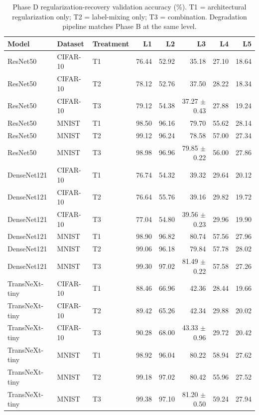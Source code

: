 \begin{table}[htbp]
\centering
\caption{Phase D regularization-recovery validation accuracy (\%). T1 = architectural regularization only; T2 = label-mixing only; T3 = combination. Degradation pipeline matches Phase B at the same level.}
\label{tab:phase_d}
\setlength{\tabcolsep}{4pt}
\renewcommand{\arraystretch}{1.1}
\begin{tabular}{lllrrrrr}
\toprule
Model & Dataset & Treatment & L1 & L2 & L3 & L4 & L5 \\
\midrule
ResNet50 & CIFAR-10 & T1 & 76.44 & 52.92 & 35.18 & 27.10 & 18.64 \\
ResNet50 & CIFAR-10 & T2 & 78.12 & 52.76 & 37.50 & 28.22 & 18.34 \\
ResNet50 & CIFAR-10 & T3 & 79.12 & 54.38 & 37.27 $\pm$ 0.43 & 27.88 & 19.24 \\
ResNet50 & MNIST & T1 & 98.50 & 96.16 & 79.70 & 55.62 & 28.14 \\
ResNet50 & MNIST & T2 & 99.12 & 96.24 & 78.58 & 57.00 & 27.34 \\
ResNet50 & MNIST & T3 & 98.98 & 96.96 & 79.85 $\pm$ 0.22 & 56.00 & 27.86 \\
DenseNet121 & CIFAR-10 & T1 & 76.74 & 54.32 & 39.32 & 29.64 & 20.12 \\
DenseNet121 & CIFAR-10 & T2 & 76.64 & 55.76 & 39.16 & 29.82 & 19.72 \\
DenseNet121 & CIFAR-10 & T3 & 77.04 & 54.80 & 39.56 $\pm$ 0.23 & 29.96 & 19.90 \\
DenseNet121 & MNIST & T1 & 98.90 & 96.82 & 80.74 & 57.56 & 27.96 \\
DenseNet121 & MNIST & T2 & 99.06 & 96.18 & 79.84 & 57.78 & 28.02 \\
DenseNet121 & MNIST & T3 & 99.30 & 97.02 & 81.49 $\pm$ 0.22 & 57.58 & 27.26 \\
TransNeXt-tiny & CIFAR-10 & T1 & 88.46 & 66.96 & 42.36 & 28.44 & 19.66 \\
TransNeXt-tiny & CIFAR-10 & T2 & 89.42 & 65.26 & 42.34 & 29.88 & 20.02 \\
TransNeXt-tiny & CIFAR-10 & T3 & 90.28 & 68.00 & 43.33 $\pm$ 0.96 & 29.72 & 20.42 \\
TransNeXt-tiny & MNIST & T1 & 98.92 & 96.04 & 80.22 & 58.94 & 27.62 \\
TransNeXt-tiny & MNIST & T2 & 99.18 & 97.02 & 80.42 & 55.96 & 27.52 \\
TransNeXt-tiny & MNIST & T3 & 99.38 & 97.10 & 81.20 $\pm$ 0.50 & 59.24 & 27.94 \\
\bottomrule
\end{tabular}
\end{table}
